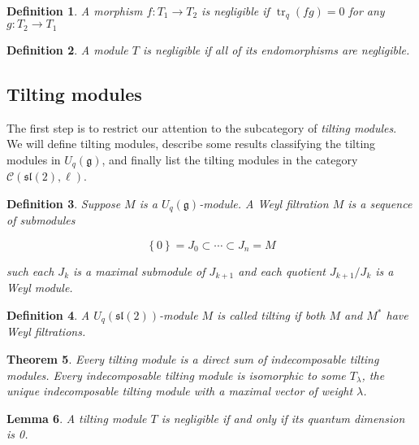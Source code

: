 \documentclass[]{article}
\newtheorem{theorem}{Theorem}[subsection]
\newtheorem{defn}[theorem]{Definition}
\newtheorem{lemma}[theorem]{Lemma}
\newcommand{\tr}{\operatorname{tr}}
\newcommand{\sll}{\mathfrak{sl}}
\numberwithin{equation}{subsection}
\begin{document}
\begin{defn}
    A morphism $f: T_1 \to T_2$ is \emph{negligible} if $\tr_q(fg) = 0$ for any $g: T_2 \to T_1$
\end{defn}


\begin{defn}
    A module $T$ is \emph{negligible} if all of its endomorphisms are negligible.
\end{defn}
\subsection{Tilting modules} 

The first step is to restrict our attention to the subcategory of \emph{tilting
modules}. We will define tilting modules, describe some results classifying the
tilting modules in $U_q(\mathfrak{g})$, and finally list the tilting modules in
the category $\mathcal{C}(\sll(2), \ell)$.

\begin{defn}
    Suppose $M$ is a $U_q(\mathfrak{g})$-module. A \emph{Weyl filtration} $M$ is a sequence of submodules 

    \begin{equation}
        \left\{ 0 \right\} = J_0 \subset \cdots \subset J_n = M
    \end{equation}

    such each $J_k$ is a maximal submodule of $J_{k+1}$ and each quotient $J_{k+1}/J_k$ is a Weyl module. 
\end{defn}

\begin{defn}
    A $U_q(\sll(2))$-module $M$ is called \emph{tilting} if both $M$ and $M^*$ have Weyl filtrations.
\end{defn}


\begin{theorem}
    Every tilting module is a direct sum of indecomposable tilting modules.
    Every indecomposable tilting module is isomorphic to some $T_\lambda$, the
    unique indecomposable tilting module with a maximal vector of weight
    $\lambda$.
\end{theorem}



\begin{lemma}
    A tilting module $T$ is negligible if and only if its quantum dimension is 0.
\end{lemma}
\end{document}
